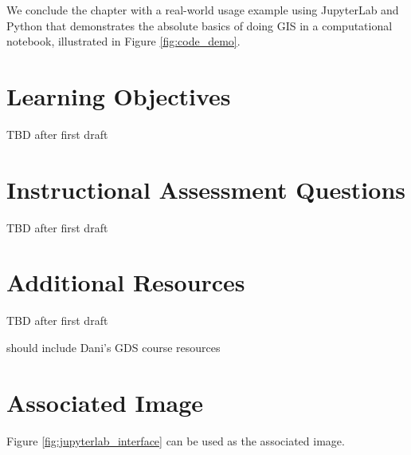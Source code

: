 \documentclass[11pt,letterpaper]{article}
\begin{document}
We conclude the chapter with a real-world usage example using JupyterLab and Python that demonstrates the absolute basics of doing GIS in a computational notebook, illustrated in Figure \ref{fig:code_demo}.

\setlength{\bibsep}{0.00cm plus 0.05cm}



\section*{Learning Objectives}

TBD after first draft

\section*{Instructional Assessment Questions}

TBD after first draft

\section*{Additional Resources}

TBD after first draft

should include Dani's GDS course resources

\section*{Associated Image}

Figure \ref{fig:jupyterlab_interface} can be used as the associated image.
\end{document}
